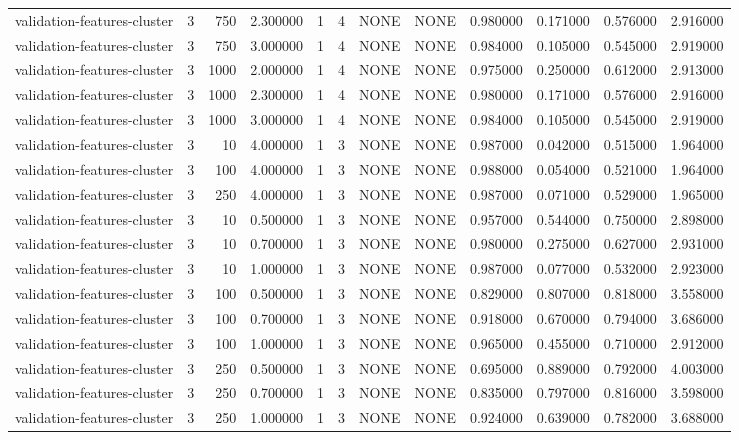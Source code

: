 \begin{tabular}{lrrrllllrrrr}
validation-features-cluster & 3 & 750 & 2.300000 & 1 & 4 & NONE & NONE & 0.980000 & 0.171000 & 0.576000 & 2.916000 \\
validation-features-cluster & 3 & 750 & 3.000000 & 1 & 4 & NONE & NONE & 0.984000 & 0.105000 & 0.545000 & 2.919000 \\
validation-features-cluster & 3 & 1000 & 2.000000 & 1 & 4 & NONE & NONE & 0.975000 & 0.250000 & 0.612000 & 2.913000 \\
validation-features-cluster & 3 & 1000 & 2.300000 & 1 & 4 & NONE & NONE & 0.980000 & 0.171000 & 0.576000 & 2.916000 \\
validation-features-cluster & 3 & 1000 & 3.000000 & 1 & 4 & NONE & NONE & 0.984000 & 0.105000 & 0.545000 & 2.919000 \\
validation-features-cluster & 3 & 10 & 4.000000 & 1 & 3 & NONE & NONE & 0.987000 & 0.042000 & 0.515000 & 1.964000 \\
validation-features-cluster & 3 & 100 & 4.000000 & 1 & 3 & NONE & NONE & 0.988000 & 0.054000 & 0.521000 & 1.964000 \\
validation-features-cluster & 3 & 250 & 4.000000 & 1 & 3 & NONE & NONE & 0.987000 & 0.071000 & 0.529000 & 1.965000 \\
validation-features-cluster & 3 & 10 & 0.500000 & 1 & 3 & NONE & NONE & 0.957000 & 0.544000 & 0.750000 & 2.898000 \\
validation-features-cluster & 3 & 10 & 0.700000 & 1 & 3 & NONE & NONE & 0.980000 & 0.275000 & 0.627000 & 2.931000 \\
validation-features-cluster & 3 & 10 & 1.000000 & 1 & 3 & NONE & NONE & 0.987000 & 0.077000 & 0.532000 & 2.923000 \\
validation-features-cluster & 3 & 100 & 0.500000 & 1 & 3 & NONE & NONE & 0.829000 & 0.807000 & 0.818000 & 3.558000 \\
validation-features-cluster & 3 & 100 & 0.700000 & 1 & 3 & NONE & NONE & 0.918000 & 0.670000 & 0.794000 & 3.686000 \\
validation-features-cluster & 3 & 100 & 1.000000 & 1 & 3 & NONE & NONE & 0.965000 & 0.455000 & 0.710000 & 2.912000 \\
validation-features-cluster & 3 & 250 & 0.500000 & 1 & 3 & NONE & NONE & 0.695000 & 0.889000 & 0.792000 & 4.003000 \\
validation-features-cluster & 3 & 250 & 0.700000 & 1 & 3 & NONE & NONE & 0.835000 & 0.797000 & 0.816000 & 3.598000 \\
validation-features-cluster & 3 & 250 & 1.000000 & 1 & 3 & NONE & NONE & 0.924000 & 0.639000 & 0.782000 & 3.688000 \\

\end{tabular}
